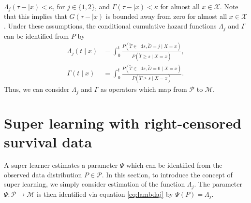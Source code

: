 \documentclass{statsoc}
\numberwithin{theorem}{section}
\newcommand*\diff{\mathop{}\!\mathrm{d}}
\newcommand{\1}{\mathds{1}}
\begin{document}
\(\Lambda_{j}(\tau- \mid x)<\kappa \), for \(j\in\{1,2\}\), and
\(\Gamma(\tau- \mid x)<\kappa\) for almost all \(x\in\mathcal X\). Note that this
implies that \(G(\tau- \mid x)\) is bounded away from zero for almost all \(x\in\mathcal X\).
Under these assumptions, the conditional cumulative hazard functions
\(\Lambda_{j}\) and \(\Gamma\) can be identified from \(P\) by
\begin{align}
  \Lambda_{j}(t \mid x) &= \int_0^t\frac{  P(\tilde T \in \diff s, \tilde D=j \mid X=x )}{P(\tilde T \geq s \mid X=x )}, \label{eq:lambdaj}\\
  \Gamma(t \mid x) &= \int_0^t\frac{  P(\tilde T \in \diff s, \tilde D=0 \mid X=x )}{P(\tilde T \geq s \mid X=x )}\label{eq:gamma}.
\end{align}
Thus, we can consider $\Lambda_j$ and \(\Gamma\) as operators which map from
\( \mathcal{P} \) to \(\mathcal M\).

 
\section{Super learning with right-censored survival data}
\label{sec:super-learning}

A super learner estimates a parameter $\Psi$ which can be identified from the
observed data distribution \(P\in\mathcal P\). In this section, to introduce the
concept of super learning, we simply consider estimation of the function
\( \Lambda_{j}\). The parameter \(\Psi:\mathcal P\to\mathcal M\) is then
identified via equation \eqref{eq:lambdaj} by \(\Psi(P)=\Lambda_j\).
\end{document}

